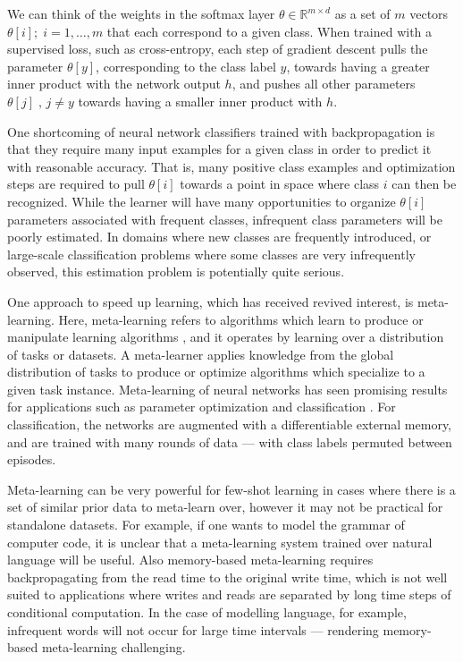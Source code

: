 \documentclass{article} \usepackage{hyperref}
\begin{document}
We can think of the weights in the softmax layer $\theta \in \mathbb{R}^{m \times d}$ as a set of $m$ vectors $\theta[i]; \; i = 1, \ldots, m$ that each correspond to a given class. When trained with a supervised loss, such as cross-entropy, each step of gradient descent pulls the parameter $\theta[y]$, corresponding to the class label $y$, towards having a greater inner product with the network output $h$, and pushes all other parameters $\theta[j]\; , \, j \neq y$ towards having a smaller inner product with $h$.

One shortcoming of neural network classifiers trained with backpropagation is that they require many input examples for a given class in order to predict it with reasonable accuracy. That is, many positive class examples and optimization steps are required to pull $\theta[i]$ towards a point in space where class $i$ can then be recognized. While the learner will have many opportunities to organize $\theta[i]$ parameters associated with frequent classes, infrequent class parameters will be poorly estimated. In domains where new classes are frequently introduced, or large-scale classification problems where some classes are very infrequently observed, this estimation problem is potentially quite serious.

One approach to speed up learning, which has received revived interest, is meta-learning. Here, meta-learning refers to algorithms which learn to produce  or manipulate learning algorithms \citep{thrun1998lifelong, hochreiter2001learning}, and it operates by learning over a distribution of tasks or datasets. A meta-learner applies knowledge from the global distribution of tasks to produce or optimize algorithms which specialize to a given task instance. Meta-learning of neural networks has seen promising results for applications such as parameter optimization \citep{andrychowicz2016learning, finn2017model} and classification \citep{santoro2016one, vinyals2016matching, zhou2018deep}. For classification, the networks are augmented with a differentiable external memory, and are trained with many rounds of data --- with class labels permuted between episodes.

Meta-learning can be very powerful for few-shot learning in cases where there is a set of similar prior data to meta-learn over, however it may not be practical for standalone datasets. For example, if one wants to model the grammar of computer code, it is unclear that a meta-learning system trained over natural language will be useful. Also memory-based meta-learning requires backpropagating from the read time to the original write time, which is not well suited to applications where writes and reads are separated by long time steps of conditional computation. In the case of modelling language, for example, infrequent words will not occur for large time intervals --- rendering memory-based meta-learning challenging.
\end{document}
